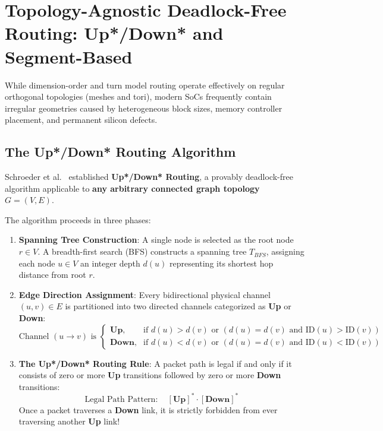 \section{Topology-Agnostic Deadlock-Free Routing: Up*/Down* and Segment-Based}
\label{sec:ch5_updown}

While dimension-order and turn model routing operate effectively on regular orthogonal topologies (meshes and tori), modern SoCs frequently contain irregular geometries caused by heterogeneous block sizes, memory controller placement, and permanent silicon defects.

\subsection{The Up*/Down* Routing Algorithm}
Schroeder et al.~\cite{Schroeder1991} established \textbf{Up*/Down* Routing}, a provably deadlock-free algorithm applicable to \textbf{any arbitrary connected graph topology} $G = (V, E)$.

The algorithm proceeds in three phases:
\begin{enumerate}
    \item \textbf{Spanning Tree Construction}: A single node is selected as the root node $r \in V$. A breadth-first search (BFS) constructs a spanning tree $T_{BFS}$, assigning each node $u \in V$ an integer depth $d(u)$ representing its shortest hop distance from root $r$.
    \item \textbf{Edge Direction Assignment}: Every bidirectional physical channel $(u, v) \in E$ is partitioned into two directed channels categorized as \textbf{Up} or \textbf{Down}:
    \begin{equation}
    \text{Channel } (u \to v) \text{ is } 
    \begin{cases}
    \textbf{Up}, & \text{if } d(u) > d(v) \text{ or } (d(u) = d(v) \text{ and } \text{ID}(u) > \text{ID}(v)) \\
    \textbf{Down}, & \text{if } d(u) < d(v) \text{ or } (d(u) = d(v) \text{ and } \text{ID}(u) < \text{ID}(v))
    \end{cases}
    \label{eq:ch5_updown_rule}
    \end{equation}
    \item \textbf{The Up*/Down* Routing Rule}: A packet path is legal if and only if it consists of zero or more \textbf{Up} transitions followed by zero or more \textbf{Down} transitions:
    \begin{equation}
    \text{Legal Path Pattern}: \quad [\textbf{Up}]^* \cdot [\textbf{Down}]^*
    \label{eq:ch5_updown_pattern}
    \end{equation}
    Once a packet traverses a \textbf{Down} link, it is strictly forbidden from ever traversing another \textbf{Up} link!
\end{enumerate}

